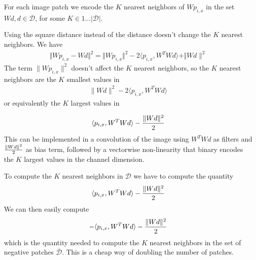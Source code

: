 \documentclass{article}
\begin{document}
For each image patch we encode the $K$ nearest neighbors of $W p_{i,x}$ in the set $Wd, d \in \mathcal{D}$, for some $ K \in 1 \ldots|\mathcal{D}| $.

Using the square distance instead of the distance doesn't change the $K$ nearest neighbors.
We have 
\begin{align*} \Vert Wp_{i,x} - Wd \Vert^2 = \Vert Wp_{i,x} \Vert^2 - 2 \langle p_{i,x}, W^T W d \rangle + \Vert Wd\|^2 \end{align*}
The term $\|Wp_{i,x}\|^2$ doesn't affect the $K$ nearest neighbors, so the $K$ nearest neighbors are the $K$ smallest values in
\begin{align*}
        \|Wd \|^2 - 2\langle p_{i,x}, W^T W d \rangle
\end{align*}
or equivalently the  $K$ largest values in

\[
        \langle p_{i,x}, W^T W d \rangle - {\|Wd \|^2 \over 2} 
\]
This can be implemented in a convolution of the image using $W^T W d$ as filters and ${\|Wd \|^2 \over 2}$ as bias term, followed by a vectorwise non-linearity that binary encodes the $K$ largest values in the channel dimension.

To compute the $K$ nearest neighbors in $\mathcal{D}$ we have to compute the quantity
\begin{align*} \langle p_{i,x}, W^T W d \rangle - {\|Wd \|^2 \over 2} \end{align*}
We can then easily compute 
\begin{align*} - \langle p_{i,x}, W^T W d \rangle - {\|Wd \|^2 \over 2} \end{align*} which is the quantity needed to compute the $K$ nearest neighbors in the set of negative patches $\overline{\mathcal{D}}$.
This is a cheap way of doubling the number of patches.
\end{document}
